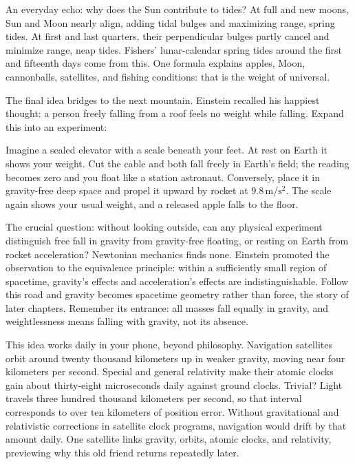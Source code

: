 An everyday echo: why does the Sun contribute to tides? At full and new moons, Sun and Moon nearly align, adding tidal bulges and maximizing range, spring tides. At first and last quarters, their perpendicular bulges partly cancel and minimize range, neap tides. Fishers' lunar-calendar spring tides around the first and fifteenth days come from this. One formula explains apples, Moon, cannonballs, satellites, and fishing conditions: that is the weight of universal.


The final idea bridges to the next mountain. Einstein recalled his happiest thought: a person freely falling from a roof feels no weight while falling. Expand this into an experiment:

\begin{thought}
Imagine a sealed elevator with a scale beneath your feet. At rest on Earth it shows your weight. Cut the cable and both fall freely in Earth's field; the reading becomes zero and you float like a station astronaut. Conversely, place it in gravity-free deep space and propel it upward by rocket at \(9.8\,\mathrm{m/s^{2}}\). The scale again shows your usual weight, and a released apple falls to the floor.

The crucial question: without looking outside, can any physical experiment distinguish free fall in gravity from gravity-free floating, or resting on Earth from rocket acceleration? Newtonian mechanics finds none. Einstein promoted the observation to the equivalence principle: within a sufficiently small region of spacetime, gravity's effects and acceleration's effects are indistinguishable. Follow this road and gravity becomes spacetime geometry rather than force, the story of later chapters. Remember its entrance: all masses fall equally in gravity, and weightlessness means falling with gravity, not its absence.
\end{thought}

This idea works daily in your phone, beyond philosophy. Navigation satellites orbit around twenty thousand kilometers up in weaker gravity, moving near four kilometers per second. Special and general relativity make their atomic clocks gain about thirty-eight microseconds daily against ground clocks. Trivial? Light travels three hundred thousand kilometers per second, so that interval corresponds to over ten kilometers of position error. Without gravitational and relativistic corrections in satellite clock programs, navigation would drift by that amount daily. One satellite links gravity, orbits, atomic clocks, and relativity, previewing why this old friend returns repeatedly later.

